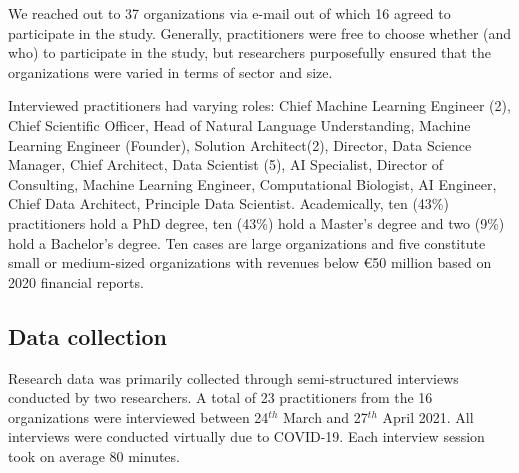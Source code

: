 We reached out to 37 organizations via e-mail out of which 16 agreed to participate in the study. %
Generally, practitioners were free to choose whether (and who) to participate in the study, but researchers purposefully ensured that the organizations were varied in terms of sector and size. 

Interviewed practitioners had varying roles: Chief Machine Learning Engineer (2), Chief Scientific Officer, Head of Natural Language Understanding,  Machine Learning Engineer (Founder), Solution Architect(2), Director, Data Science Manager, Chief Architect, Data Scientist (5), AI Specialist, Director of Consulting, Machine Learning Engineer, Computational Biologist, AI Engineer, Chief Data Architect, Principle Data Scientist.
Academically, ten (43\%) practitioners hold a PhD degree, ten (43\%) hold a Master's degree and two (9\%) hold a Bachelor's degree. %
%
Ten cases are large organizations and five constitute small or medium-sized organizations with revenues below €50 million based on 2020 financial reports.

\subsection{Data collection}

Research data was primarily collected through semi-structured interviews conducted by two researchers. A total of 23 practitioners from the 16 organizations were interviewed between 24$^{th}$ March and 27$^{th}$ April 2021. All interviews were conducted virtually due to COVID-19. Each interview session took on average 80 minutes. 

